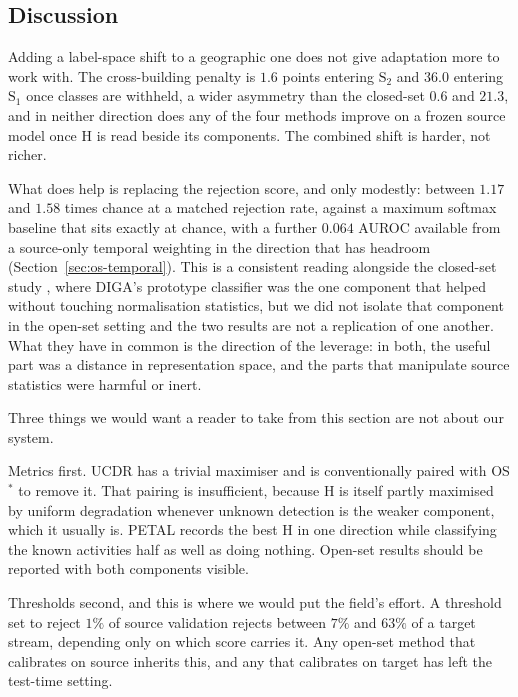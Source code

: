 \subsection{Discussion}
\label{sec:os-discussion}

Adding a label-space shift to a geographic one does not give adaptation more to work with.
The cross-building penalty is $1.6$ points entering $\text{S}_2$ and $36.0$ entering
$\text{S}_1$ once classes are withheld, a wider asymmetry than the closed-set
$0.6$ and $21.3$, and in neither direction does any of the four methods improve on a frozen
source model once H is read beside its components. The combined shift is harder, not
richer.

What does help is replacing the rejection score, and only modestly: between $1.17$ and
$1.58$ times chance at a matched rejection rate, against a maximum softmax baseline that
sits exactly at chance, with a further $0.064$ AUROC available from a source-only temporal
weighting in the direction that has headroom (Section~\ref{sec:os-temporal}). This is a consistent reading alongside
the closed-set study \cite{kbaier_closedset}, where DIGA's prototype classifier was the one component that
helped without touching normalisation statistics, but we did not isolate that component in
the open-set setting and the two results are not a replication of one another. What they
have in common is the direction of the leverage: in both, the useful part was a distance
in representation space, and the parts that manipulate source statistics were harmful or
inert.

Three things we would want a reader to take from this section are not about our system.

Metrics first. UCDR has a trivial maximiser and is conventionally paired with OS$^{*}$ to
remove it. That pairing is insufficient, because H is itself partly maximised by uniform
degradation whenever unknown detection is the weaker component, which it usually is.
PETAL records the best H in one direction while classifying the known activities half as
well as doing nothing. Open-set results should be reported with both components visible.

Thresholds second, and this is where we would put the field's effort. A threshold set to
reject $1\%$ of source validation rejects between $7\%$ and $63\%$ of a target stream,
depending only on which score carries it. Any open-set method that calibrates on source
inherits this, and any that calibrates on target has left the test-time setting.

